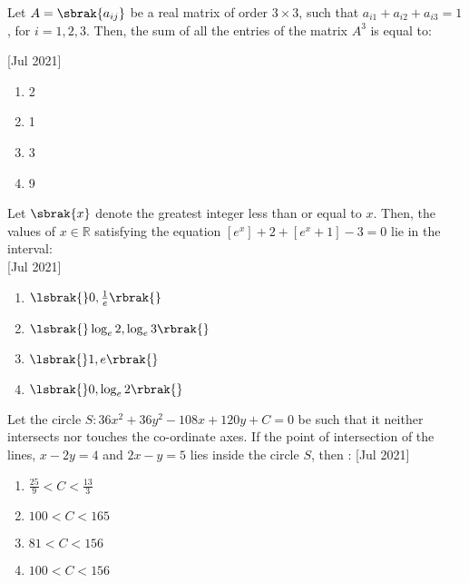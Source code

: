     \item{
        	Let $A=\sbrak{a_{ij}}$ be a real matrix of order $3 \times 3$, such that $a_{i1}+a_{i2}+a_{i3}=1$, for $i=1,2,3$. Then, the sum of all the entries of the matrix $A^3$ is equal to:
        	
             \text{   }\hfill
                {[Jul 2021]}
				\begin{multicols}{4}
	                \begin{enumerate}
	                   	\item 2
	                   	\item 1
	                   	\item 3
	                   	\item 9
	                \end{enumerate}
				\end{multicols}
        
        }
 \item{
    	
	    	Let $\sbrak{x}$ denote the greatest integer less than or equal to $x$. Then, the values of $x \in \mathbb{R}$ satisfying the equation $[e^x] + 2 + [e^{x}+1] - 3 = 0$ lie in the interval:\\
	    	\text{   }\hfill
	    	{[Jul 2021]}
	    	\begin{multicols}{4}
	    		\begin{enumerate}
	    			\item $\lsbrak{}0, \frac{1}{e}\rbrak{}$
	    			\item $\lsbrak{} \log_e{2}, \log_e{3}\rbrak{}$
	    			\item $\lsbrak{}1, e\rbrak{}$
	    			\item $\lsbrak{}0, \log_e{2}\rbrak{}$
	    		\end{enumerate}
	    	\end{multicols}
	    	
	    }
    \item{
	
		    Let the circle $S: 36x^2 + 36y^2 - 108x + 120y + C = 0$ be such that it neither intersects nor touches the
		    co-ordinate axes. If the point of intersection of the lines, $x - 2y = 4$ and $2x - y = 5$ lies inside the
		    circle $S$, then :
			\text{   }\hfill
			{[Jul 2021]}
			\begin{multicols}{4}
				\begin{enumerate}
						\item $\frac{25}{9} < C < \frac{13}{3}$
						\item $100 < C < 165$
						\item $ 81 < C < 156$
						\item $100 < C < 156$
				\end{enumerate}
			\end{multicols}
			
		}

